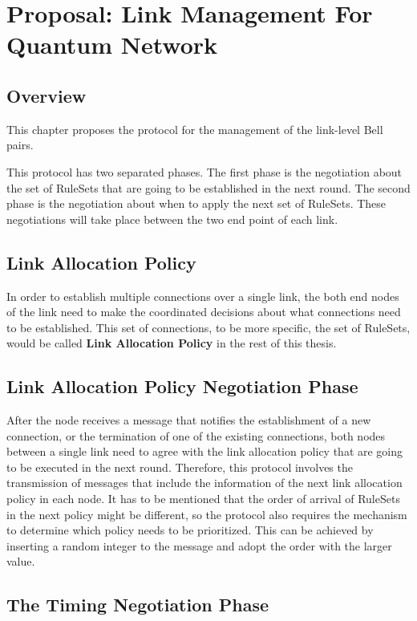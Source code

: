 \chapter{Proposal: Link Management For Quantum Network}
\label{proposal}

\section{Overview}

This chapter proposes the protocol for the management of the link-level Bell pairs.

This protocol has two separated phases. The first phase is the negotiation about the set of RuleSets that are going to be established in the next round. The second phase is the negotiation about when to apply the next set of RuleSets.
These negotiations will take place between the two end point of each link.

\section{Link Allocation Policy}

In order to establish multiple connections over a single link, the both end nodes of the link need to make the coordinated decisions about what connections need to be established.
This set of connections, to be more specific, the set of RuleSets, would be called \textbf{Link Allocation Policy} in the rest of this thesis.

\section{Link Allocation Policy Negotiation Phase}

After the node receives a message that notifies the establishment of a new connection, or the termination of one of the existing connections, both nodes between a single link need to agree with the link allocation policy that are going to be executed in the next round.
Therefore, this protocol involves the transmission of messages that include the information of the next link allocation policy in each node.  It has to be mentioned that the order of arrival of RuleSets in the next policy might be different, so the protocol also requires the mechanism to determine which policy needs to be prioritized.
This can be achieved by inserting a random integer to the message and adopt the order with the larger value.

\section{The Timing Negotiation Phase}

